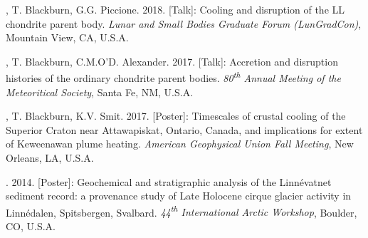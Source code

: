 \begin{etaremune} [itemsep=4pt, leftmargin=3ex]
	\item  \ghedwards, T. Blackburn, G.G. Piccione. 2018. [Talk]: Cooling and disruption of the LL chondrite parent body. \textit{Lunar and Small Bodies Graduate Forum (LunGradCon)}, Mountain View, CA, U.S.A.
	
  \item  \ghedwards, T. Blackburn, C.M.O’D. Alexander. 2017. [Talk]: Accretion and disruption histories of the ordinary chondrite parent bodies. \textit{80\textsuperscript{th} Annual Meeting of the Meteoritical Society}, Santa Fe, NM, U.S.A.
  
  \item \ghedwards, T. Blackburn, K.V. Smit. 2017. [Poster]: Timescales of crustal cooling of the Superior Craton near Attawapiskat, Ontario, Canada, and implications for extent of Keweenawan plume heating. \textit{American Geophysical Union Fall Meeting}, New Orleans, LA, U.S.A.
  
  \item \ghedwards. 2014. [Poster]: Geochemical and stratigraphic analysis of the Linnévatnet sediment record: a provenance study of Late Holocene cirque glacier activity in Linnédalen, Spitsbergen, Svalbard. \textit{44\textsuperscript{th} International Arctic Workshop}, Boulder, CO, U.S.A.
\end{etaremune}



